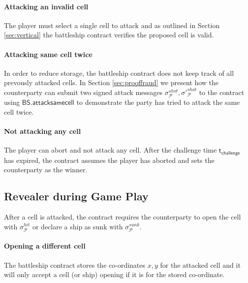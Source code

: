 \documentclass{llncs}
\newcommand{\participant}{\mathcal{P}}
\newcommand{\battleshipsamecell}{\mathsf{BS.attacksamecell}}
\newcommand{\timechallenge}{\mathsf{t}_{\mathsf{challenge}}}
\begin{document}
	\paragraph{Attacking an invalid cell}
	The player must select a single cell to attack and as outlined in Section \ref{sec:vertical} the battleship contract verifies the proposed cell is valid. 
	
	\paragraph{Attacking same cell twice} 
	In order to reduce storage, the battleship contract does not keep track of all prevously attacked cells. 
	In Section \ref{sec:prooffraud} we present how the counterparty can submit two signed attack messages $\sigma^{shot}_{\participant},\sigma'^{shot}_{\participant}$ to the contract using $\battleshipsamecell$ to demonstrate the party has tried to attack the same cell twice. 
	
	\paragraph{Not attacking any cell} 
	The player can abort and not attack any cell. 
	After the challenge time $\timechallenge$ has expired, the contract assumes the player has aborted and sets the counterparty as the winner. 
	
	\subsection{Revealer during Game Play} 
	After a cell is attacked, the contract requires the counterparty to open the cell with $\sigma^{hit}_{\participant}$ or declare a ship as sunk with  $\sigma^{sunk}_{\participant}$.
	
	\paragraph{Opening a different cell}
	The battleship contract stores the co-ordinates $x,y$ for the attacked cell and it will only accept a cell (or ship) opening if it is for the stored co-ordinate. 
	
\end{document}
